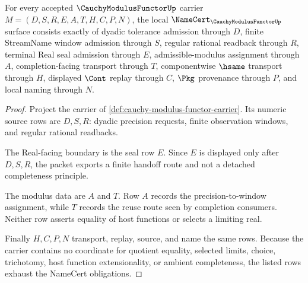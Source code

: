 \begin{theorem}
\label{thm:cauchy-modulus-functor-namecert-obligations}
For every accepted $\CauchyModulusFunctorUp$ carrier $M=(D,S,R,E,A,T,H,C,P,N)$, the local $\NameCert_{\CauchyModulusFunctorUp}$ surface consists exactly of dyadic tolerance admission through $D$, finite StreamName window admission through $S$, regular rational readback through $R$, terminal Real seal admission through $E$, admissible-modulus assignment through $A$, completion-facing transport through $T$, componentwise $\hsame$ transport through $H$, displayed $\Cont$ replay through $C$, $\Pkg$ provenance through $P$, and local naming through $N$.
\end{theorem}
\begin{proof}
Project the carrier of \autoref{def:cauchy-modulus-functor-carrier}. Its numeric source rows are $D,S,R$: dyadic precision requests, finite observation windows, and regular rational readbacks.

The Real-facing boundary is the seal row $E$. Since $E$ is displayed only after $D,S,R$, the packet exports a finite handoff route and not a detached completeness principle.

The modulus data are $A$ and $T$. Row $A$ records the precision-to-window assignment, while $T$ records the reuse route seen by completion consumers. Neither row asserts equality of host functions or selects a limiting real.

Finally $H,C,P,N$ transport, replay, source, and name the same rows. Because the carrier contains no coordinate for quotient equality, selected limits, choice, trichotomy, host function extensionality, or ambient completeness, the listed rows exhaust the NameCert obligations.
\end{proof}

